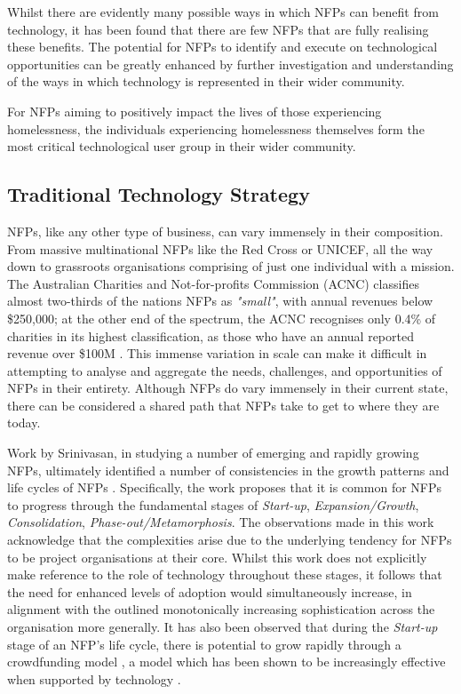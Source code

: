 Whilst there are evidently many possible ways in which NFPs can benefit from technology, it has been found that there are few NFPs that are fully realising these benefits. The potential for NFPs to identify and execute on technological opportunities can be greatly enhanced by further investigation and understanding of the ways in which technology is represented in their wider community.

For NFPs aiming to positively impact the lives of those experiencing homelessness, the individuals experiencing homelessness themselves form the most critical technological user group in their wider community.

\subsection{Traditional Technology Strategy}

NFPs, like any other type of business, can vary immensely in their composition. From massive multinational NFPs like the Red Cross or UNICEF, all the way down to grassroots organisations comprising of just one individual with a mission. The Australian Charities and Not-for-profits Commission (ACNC) classifies almost two-thirds of the nations NFPs as \emph{"small"}, with annual revenues below \$250,000; at the other end of the spectrum, the ACNC recognises only 0.4\% of charities in its highest classification, as those who have an annual reported revenue over \$100M \cite{acnc2020}. This immense variation in scale can make it difficult in attempting to analyse and aggregate the needs, challenges, and opportunities of NFPs in their entirety. Although NFPs do vary immensely in their current state, there can be considered a shared path that NFPs take to get to where they are today.

Work by Srinivasan, in studying a number of emerging and rapidly growing NFPs, ultimately identified a number of consistencies in the growth patterns and life cycles of NFPs \cite{srinivasan2007understanding}. Specifically, the work proposes that it is common for NFPs to progress through the fundamental stages of \emph{Start-up}, \emph{Expansion/Growth}, \emph{Consolidation}, \emph{Phase-out/Metamorphosis}. The observations made in this work acknowledge that the complexities arise due to the underlying tendency for NFPs to be project organisations at their core. Whilst this work does not explicitly make reference to the role of technology throughout these stages, it follows that the need for enhanced levels of adoption would simultaneously increase, in alignment with the outlined monotonically increasing sophistication across the organisation more generally. It has also been observed that during the \emph{Start-up} stage of an NFP's life cycle, there is potential to grow rapidly through a crowdfunding model \cite{paschen2017choose}, a model which has been shown to be increasingly effective when supported by technology \cite{polishchuk2019technology}.


